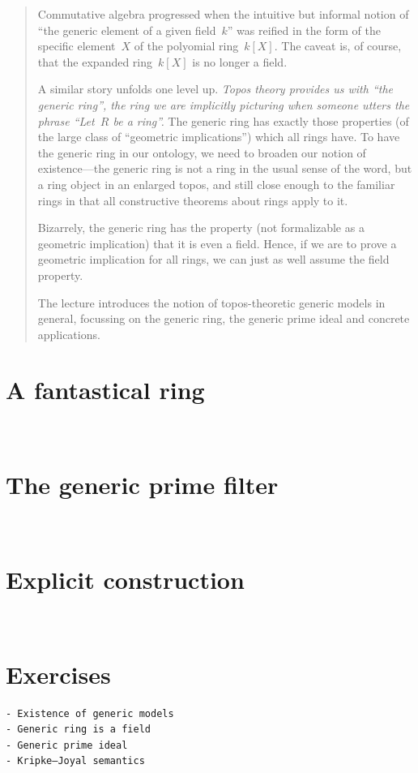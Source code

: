 \documentclass[10pt,reqno,a4paper,openany]{amsbook}
\theoremstyle{definition}
\theoremstyle{plain}
\theoremstyle{remark}
\newcommand{\?}{\,{:}\,}
\renewcommand{\_}{\mathpunct{.}\,}
\newenvironment{intro}{\begin{quote}}{\end{quote}\bigskip}
\begin{document}
\begin{intro}
Commutative algebra progressed when the intuitive but informal notion of
``the generic element of a given field~$k$'' was reified in the form of the
specific element~$X$ of the polyomial ring~$k[X]$. The caveat is, of course,
that the expanded ring~$k[X]$ is no longer a field.

A similar story unfolds one level up. \emph{Topos theory provides us with ``the
generic ring'', the ring we are implicitly picturing when someone utters
the phrase ``Let~$R$ be a ring''.} The generic ring has exactly those
properties (of the large class of ``geometric implications'') which all rings
have. To have the generic ring in our ontology,
we need to broaden our notion of existence---the generic ring is not a
ring in the usual sense of the word, but a ring object in an enlarged
topos, and still close enough to the familiar rings in that all
constructive theorems about rings apply to it.

Bizarrely, the generic ring has the property (not formalizable as a
geometric implication) that it is even a field. Hence, if we are to
prove a geometric implication for all rings, we can just as well assume
the field property.

The lecture introduces the notion of topos-theoretic generic models in
general, focussing on the generic ring, the generic prime ideal and
concrete applications.
\end{intro}


\section{A fantastical ring}
\newpage
\ \newpage

\section{The generic prime filter}
\newpage
\ \newpage

\section{Explicit construction}
\newpage
\ \newpage

\section{Exercises}


\vfill{\small%
\begin{verbatim}
- Existence of generic models
- Generic ring is a field
- Generic prime ideal
- Kripke–Joyal semantics
\end{verbatim}
}

\printbibliography
\end{document}
